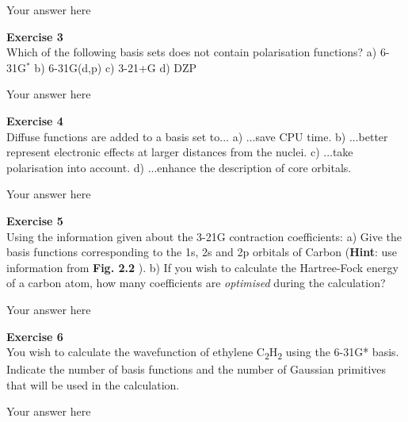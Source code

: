 \documentclass{article}
\begin{document}
Your answer here

\begin{mdframed}
\textbf{Exercise 3}\\
Which of the following basis sets does not contain polarisation functions?\newline
a) 6-31G$^\ast$\newline
b) 6-31G(d,p)\newline
c) 3-21+G\newline
d) DZP
\end{mdframed}

Your answer here

\begin{mdframed}
\textbf{Exercise 4}\\
Diffuse functions are added to a basis set to...\newline
a) ...save CPU time.\newline
b) ...better represent electronic effects at larger distances from the nuclei.\newline
c) ...take polarisation into account.\newline
d) ...enhance the description of core orbitals.
\end{mdframed}

Your answer here

\begin{mdframed}
\textbf{Exercise 5}\\
Using the information given about the 3-21G contraction coefficients:\newline
a) Give the basis functions corresponding to the 1s, 2s and 2p orbitals of Carbon (\textbf{Hint}: use information from \textbf{Fig. 2.2} ).\newline
b) If you wish to calculate the Hartree-Fock energy of a carbon atom,
how many coefficients are \textit{optimised} during the calculation?
\end{mdframed}

Your answer here

\begin{mdframed}
\textbf{Exercise 6}\\
You wish to calculate the wavefunction of ethylene C\textsubscript{2}H\textsubscript{2} using the 6-31G* basis. \newline
Indicate the number of basis functions and the number of Gaussian primitives that will be used in the calculation.
\end{mdframed}

Your answer here
\end{document}
